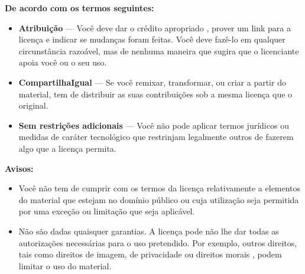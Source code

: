 \textbf{De acordo com os termos seguintes:}\\
\begin{itemize}
	\item \ccAttribution \textbf{ Atribuição} — Você deve dar o crédito apropriado , prover um link para a licença e indicar se mudanças foram feitas. Você deve fazê-lo em qualquer circunstância razoável, mas de nenhuma maneira que sugira que o licenciante apoia você ou o seu uso.
	\item \ccShare \textbf{ CompartilhaIgual} — Se você remixar, transformar, ou criar a partir do material, tem de distribuir as suas contribuições sob a mesma licença que o original.
	\item \textbf{Sem restrições adicionais} — Você não pode aplicar termos jurídicos ou medidas de caráter tecnológico que restrinjam legalmente outros de fazerem algo que a licença permita.	
\end{itemize}

\textbf{Avisos:}
\begin{itemize}
	\item Você não tem de cumprir com os termos da licença relativamente a elementos do material que estejam no domínio público ou cuja utilização seja permitida por uma exceção ou limitação que seja aplicável.
	\item Não são dadas quaisquer garantias. A licença pode não lhe dar todas as autorizações necessárias para o uso pretendido. Por exemplo, outros direitos, tais como direitos de imagem, de privacidade ou direitos morais , podem limitar o uso do material.
\end{itemize}
